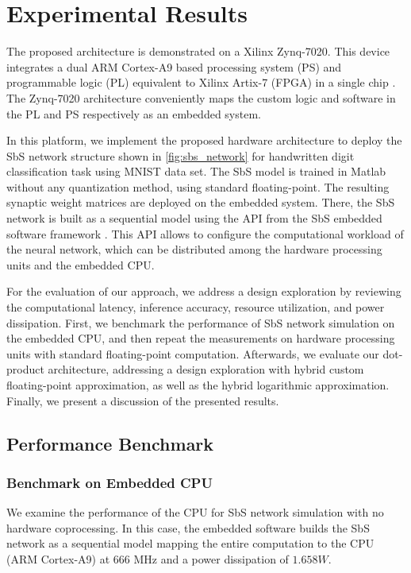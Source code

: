 \section{Experimental Results}
\label{sec:experimental_results}
The proposed architecture is demonstrated on a Xilinx Zynq-7020. This device integrates a dual ARM Cortex-A9 based processing system (PS) and programmable logic (PL) equivalent to Xilinx Artix-7 (FPGA) in a single chip \cite{xilinx2015zynq}. The Zynq-7020 architecture conveniently maps the custom logic and software in the PL and PS respectively as an embedded system.

In this platform, we implement the proposed hardware architecture to deploy the SbS network structure shown in \ref{fig:sbs_network} for handwritten digit classification task using MNIST data set. The SbS model is trained in Matlab without any quantization method, using standard floating-point. The resulting synaptic weight matrices are deployed on the embedded system. There, the SbS network is built as a sequential model using the API from the SbS embedded software framework \cite{nevarez2020accelerator}. This API allows to configure the computational workload of the neural network, which can be distributed among the hardware processing units and the embedded CPU.

For the evaluation of our approach, we address a design exploration by reviewing the computational latency, inference accuracy, resource utilization, and power dissipation. First, we benchmark the performance of SbS network simulation on the embedded CPU, and then repeat the measurements on hardware processing units with standard floating-point computation. Afterwards, we evaluate our dot-product architecture, addressing a design exploration with hybrid custom floating-point approximation, as well as the hybrid logarithmic approximation. Finally, we present a discussion of the presented results.


\subsection{Performance Benchmark}
\subsubsection{Benchmark on Embedded CPU}

We examine the performance of the CPU for SbS network simulation with no hardware coprocessing. In this case, the embedded software builds the SbS network as a sequential model mapping the entire computation to the CPU (ARM Cortex-A9) at 666 MHz and a power dissipation of $1.658 W$.

